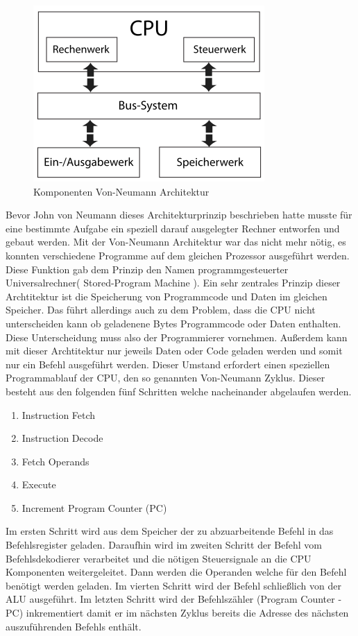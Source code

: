 \documentclass[12pt]{article}
\begin{document}
\begin{figure}[!htb]
\centering
\includegraphics[scale=0.60]{Von-Neumann_Architektur}
\caption{Komponenten Von-Neumann Architektur}
\centering
\label{fig:vonNeumann}
\end{figure}
Bevor John von Neumann dieses Architekturprinzip beschrieben hatte musste für eine bestimmte Aufgabe ein speziell darauf ausgelegter Rechner entworfen und gebaut werden. Mit der Von-Neumann Architektur war das nicht mehr nötig, es konnten verschiedene Programme auf dem gleichen Prozessor ausgeführt werden. Diese Funktion gab dem Prinzip den Namen programmgesteuerter Universalrechner( Stored-Program Machine )\cite{TaschenbuchMikroprozessortechnik}.
Ein sehr zentrales Prinzip dieser Archtitektur ist die Speicherung von Programmcode und Daten im gleichen Speicher. Das führt allerdings auch zu dem Problem, dass die CPU nicht unterscheiden kann ob geladenene Bytes Programmcode oder Daten enthalten. Diese Unterscheidung muss also der Programmierer vornehmen. Außerdem kann mit dieser Archtitektur nur jeweils Daten oder Code geladen werden und somit nur ein Befehl ausgeführt werden. Dieser Umstand erfordert einen speziellen Programmablauf der CPU, den so genannten Von-Neumann Zyklus. Dieser besteht aus den folgenden fünf Schritten welche nacheinander abgelaufen werden.
\begin{enumerate}
\item Instruction Fetch 
\item Instruction Decode
\item Fetch Operands
\item Execute
\item Increment Program Counter (PC)
\end{enumerate}
Im ersten Schritt wird aus dem Speicher der zu abzuarbeitende Befehl in das Befehlsregister geladen. Daraufhin wird im zweiten Schritt der Befehl vom Befehlsdekodierer verarbeitet und die nötigen Steuersignale an die CPU Komponenten weitergeleitet. Dann werden die Operanden welche für den Befehl benötigt werden geladen. Im vierten Schritt wird der Befehl schließlich von der ALU ausgeführt. Im letzten Schritt wird der Befehlszähler (Program Counter - PC) inkrementiert damit er im nächsten Zyklus bereits die Adresse des nächsten auszuführenden Befehls enthält.
\end{document}
